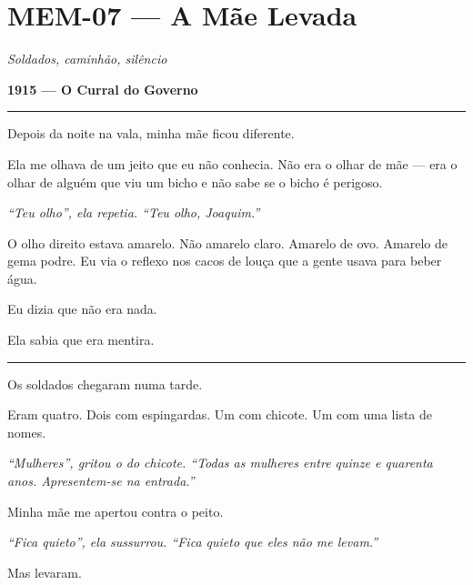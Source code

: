 \section*{\textbf{MEM-07} --- A Mãe Levada}

\noindent \textit{Soldados, caminhão, silêncio}

\noindent \textbf{1915 --- O Curral do Governo}

\vspace{0.5em}\noindent\rule{\textwidth}{0.5pt}\vspace{0.5em}

\noindent Depois da noite na vala, minha mãe ficou diferente.

\noindent Ela me olhava de um jeito que eu não conhecia. Não era o olhar de mãe --- era o olhar de alguém que viu um bicho e não sabe se o bicho é perigoso.

\noindent \textit{\textquotedblleft{}Teu olho\textquotedblright{}\textit{, ela repetia. }\textquotedblleft{}Teu olho, Joaquim.\textquotedblright{}}

\noindent O olho direito estava amarelo. Não amarelo claro. Amarelo de ovo. Amarelo de gema podre. Eu via o reflexo nos cacos de louça que a gente usava para beber água.

\noindent Eu dizia que não era nada.

\noindent Ela sabia que era mentira.

\vspace{0.5em}\noindent\rule{\textwidth}{0.5pt}\vspace{0.5em}

\noindent Os soldados chegaram numa tarde.

\noindent Eram quatro. Dois com espingardas. Um com chicote. Um com uma lista de nomes.

\noindent \textit{\textquotedblleft{}Mulheres\textquotedblright{}\textit{, gritou o do chicote. }\textquotedblleft{}Todas as mulheres entre quinze e quarenta anos. Apresentem-se na entrada.\textquotedblright{}}

\noindent Minha mãe me apertou contra o peito.

\noindent \textit{\textquotedblleft{}Fica quieto\textquotedblright{}\textit{, ela sussurrou. }\textquotedblleft{}Fica quieto que eles não me levam.\textquotedblright{}}

\noindent Mas levaram.

